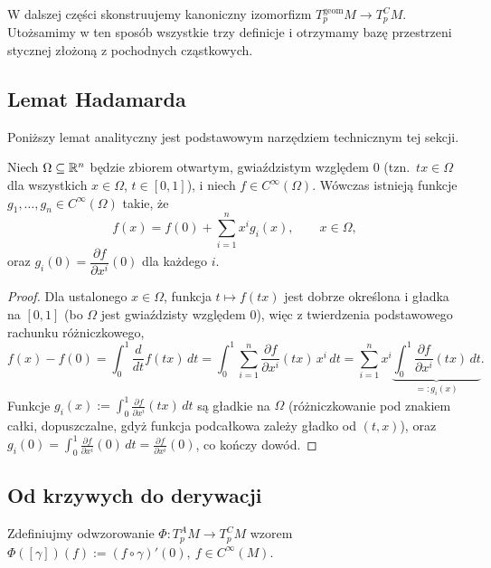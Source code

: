 W dalszej części skonstruujemy kanoniczny izomorfizm
$T_p^{\mathrm{geom}}M\to T_p^CM$. Utożsamimy w ten sposób
wszystkie trzy definicje i otrzymamy bazę przestrzeni
stycznej złożoną z pochodnych cząstkowych.

\subsection*{Lemat Hadamarda}

Poniższy lemat analityczny jest podstawowym narzędziem technicznym tej sekcji.

\begin{lemat}\label{lem:hadamard}
Niech $\Omega\subseteq\mathbb{R}^n$ będzie zbiorem otwartym, gwiaździstym względem $0$ (tzn.\
$tx\in\Omega$ dla wszystkich $x\in\Omega$, $t\in[0,1]$), i niech $f\in C^\infty(\Omega)$.
Wówczas istnieją funkcje $g_1,\dots,g_n\in C^\infty(\Omega)$ takie, że
\[
f(x)=f(0)+\sum_{i=1}^nx^ig_i(x), \qquad x\in\Omega,
\]
oraz $g_i(0)=\dfrac{\partial f}{\partial x^i}(0)$ dla każdego $i$.
\end{lemat}

\begin{proof}
Dla ustalonego $x\in\Omega$, funkcja $t\mapsto f(tx)$ jest dobrze określona i gładka na
$[0,1]$ (bo $\Omega$ jest gwiaździsty względem $0$), więc z twierdzenia podstawowego
rachunku różniczkowego,
\[
f(x)-f(0)=\int_0^1\frac{d}{dt}f(tx)\,dt=\int_0^1\sum_{i=1}^n\frac{\partial f}{\partial x^i}
(tx)\,x^i\,dt=\sum_{i=1}^nx^i\underbrace{\int_0^1\frac{\partial f}{\partial x^i}(tx)\,dt}
_{=:g_i(x)}.
\]
Funkcje $g_i(x):=\int_0^1\frac{\partial f}{\partial x^i}(tx)\,dt$ są gładkie na $\Omega$
(różniczkowanie pod znakiem całki, dopuszczalne, gdyż funkcja podcałkowa zależy gładko od
$(t,x)$), oraz $g_i(0)=\int_0^1\frac{\partial f}{\partial x^i}(0)\,dt=\frac{\partial f}
{\partial x^i}(0)$, co kończy dowód.
\end{proof}

\subsection*{Od krzywych do derywacji}

Zdefiniujmy odwzorowanie $\Phi\colon T_p^AM\to T_p^CM$ wzorem
$\Phi([\gamma])(f):=(f\circ\gamma)'(0), \ f\in C^\infty(M)$.

